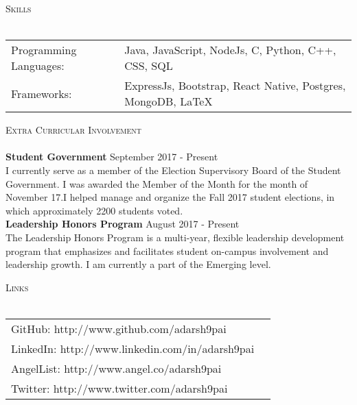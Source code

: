 \documentclass[a4paper]{article}
\newcommand{\lineunder} {
    \vspace*{-8pt} \\
    \hspace*{-18pt} \hrulefill \\
}
\newcommand{\header} [1] {
    {\hspace*{-18pt}\vspace*{6pt} \textsc{#1}}
    \vspace*{-6pt} \lineunder
}
\begin{document}
\header{Skills}
\begin{tabular}{ l l }
	Programming Languages: & Java, JavaScript, NodeJs, C, Python, C++, CSS, SQL    \\
	Frameworks:            & ExpressJs, Bootstrap, React Native, Postgres, MongoDB, LaTeX \\
\end{tabular}
\vspace{2mm}


\header{Extra Curricular Involvement}
\textbf{Student Government} \hfill September 2017 - Present\\
I currently serve as a member of the Election Supervisory Board of the Student Government. I was awarded the Member of the Month for the month of November \textquotesingle{}17.I helped manage and organize the Fall 2017 student elections, in which approximately 2200 students voted.\\
\vspace*{2mm}
\textbf{Leadership Honors Program} \hfill August 2017 - Present\\
The Leadership Honors Program is a multi-year, flexible leadership development program that emphasizes and facilitates student on-campus involvement and leadership growth. I am currently a part of the Emerging level.\\
\vspace*{2mm}

\header{Links}
\vspace{2mm} 
\begin{tabular}{ l l }
	GitHub: http://www.github.com/adarsh9pai   \\
    LinkedIn: http://www.linkedin.com/in/adarsh9pai   \\
    AngelList: http://www.angel.co/adarsh9pai   \\
    Twitter: http://www.twitter.com/adarsh9pai   \\
	
\end{tabular}
\vspace{2mm}

\ 
\end{document}
